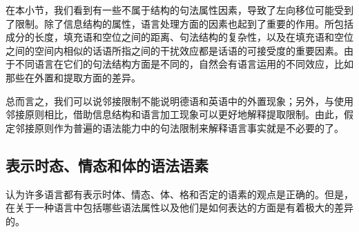 在本小节，我们看到有一些不属于结构的句法属性因素，导致了左向移位可能受到了限制。除了信息结构的属性，语言处理方面的因素\label{Seite-Subjazenz-Performanz}也起到了重要的作用\citep*{Grosu73a,EC2000a,Gibson98a,KK93a,Hawkins99a,SHS2007a}。所包括成分的长度，填充语和空位之间的距离、句法结构的复杂性，以及在填充语和空位之间的空间内相似的话语所指之间的干扰效应都是话语的可接受度的重要因素。由于不同语言在它们的句法结构方面是不同的，自然会有语言运用的不同效应，比如那些在外置和提取方面的差异。

总而言之，我们可以说邻接限制不能说明德语和英语中的外置现象；另外，与使用邻接原则相比，借助信息结构和语言加工现象可以更好地解释提取限制。由此，假定邻接原则作为普遍的语法能力中的句法限制来解释语言事实就是不必要的了。

\subsection{表示时态、情态和体的语法语素}

 \citet[]{Pinker94a}认为许多语言都有表示时体、情态、体、格和否定的语素的观点是正确的。但是，在关于一种语言中包括哪些语法属性以及他们是如何表达的方面是有着极大的差异的。

